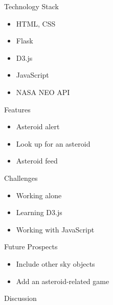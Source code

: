 \documentclass[10pt]{beamer}
\begin{document}
\begin{frame}{ Technology Stack }
\begin{itemize}
\item HTML, CSS
\pause
\item Flask
\pause
\item D3.js
\pause
\item JavaScript
\pause
\item NASA NEO API
\end{itemize}
\end{frame}


\begin{frame}{Features}
\begin{itemize}
   \item Asteroid alert
  \item Look up for an asteroid
  \item Asteroid feed
  \end{itemize}
\end{frame}





\begin{frame}{Challenges}
\begin{itemize}
  \item Working alone
  \pause
   \item Learning D3.js
   \pause
  \item Working with JavaScript
  \pause
  

  \end{itemize}
\end{frame}

\begin{frame}{Future Prospects}
\begin{itemize}
   \item Include other sky objects
   \pause
  \item Add an asteroid-related game
  \end{itemize}
\end{frame}


\begin{frame}
\begin{center}
 \Huge Discussion
   \end{center}
\end{frame}
\end{document}
